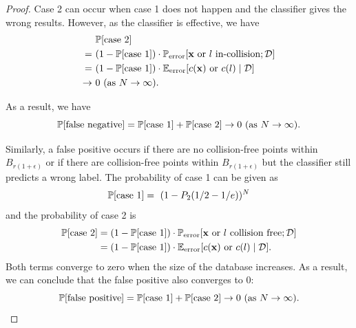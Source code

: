 \begin{proof}
Case 2 can occur when case 1 does not happen and the classifier gives the wrong results. However, as the classifier is effective, we have
\begin{align}
  &\ \mathbb P[\text{case 2}] \notag \\
 =& \ (1 - \mathbb P[\text{case 1}])\cdot \mathbb P_{\text{error}}[\mathbf x \text{ or } l \text{ in-collision}; \mathcal D] \notag \\
 =& \ (1 - \mathbb P[\text{case 1}])\cdot \mathbb E_{\text{error}}[c(\mathbf x) \text{ or } c(l) \mid \mathcal D] \notag \\
 \rightarrow &\ 0 \ (\text{as } N \rightarrow \infty). \notag
\end{align}

As a result, we have
\begin{equation}
\mathbb P[\text{false negative}] = \mathbb P[\text{case 1}] + \mathbb P[\text{case 2}] \rightarrow 0 \ (\text{as } N \rightarrow \infty) \notag.
\end{equation}

Similarly, a false positive occurs if there are no collision-free points within $B_{r(1+\epsilon)}$ or if there are collision-free points within $B_{r(1+\epsilon)}$ but the classifier still predicts a wrong label. The probability of case 1 can be given as
\begin{equation}
\mathbb P[\text{case 1}] = \ (1-P_2(1/2-1/e))^N \notag
\end{equation}
and the probability of case 2 is
\begin{align}
\mathbb P[\text{case 2}] &= (1 - \mathbb P[\text{case 1}]) \cdot \mathbb P_{\text{error}} [\mathbf x \text{ or } l \text{ collision free}; \mathcal D] \notag \\
 &= (1 - \mathbb P[\text{case 1}])\cdot \mathbb E_{\text{error}}[c(\mathbf x) \text{ or } c(l) \mid \mathcal D]. \notag \\
\end{align}
Both terms converge to zero when the size of the database increases. As a result, we can conclude that the false positive also converges to $0$:
\begin{equation}
\mathbb P[\text{false positive}] = \mathbb P[\text{case 1}] + \mathbb P[\text{case 2}]\rightarrow 0 \ (\text{as } N \rightarrow \infty). \notag
\end{equation}
\end{proof}
